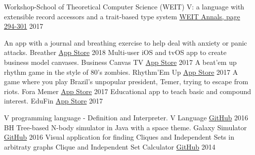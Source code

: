 

\begin{cventries}
  \cventry
    {Workshop-School of Theoretical Computer Science (WEIT)}
    {V: a language with extensible record accessors and a trait-based type system}
    {\href{http://weit2017.inf.ufsm.br/wp-content/uploads/2017/10/Versao_final.pdf}{WEIT Annals, page 294-301}}
    {2017}
    {
    }
\end{cventries}


\begin{cventries}
  \cvcompactentry
    {An app with a journal and breathing exercise to help deal with anxiety or panic attacks.}
    {Breather}
    {\href{https://itunes.apple.com/app/id1370659046?mt=8}{App Store}}
    {2018}
  \cvcompactentry
    {Multi-user iOS and tvOS app to create business model canvases.}
    {Business Canvas TV}
    {\href{https://itunes.apple.com/app/id1292335686?mt=8}{App Store}}
    {2017}
  \cvcompactentry
    {A beat'em up rhythm game in the style of 80's zombies.}
    {Rhythm'Em Up}
    {\href{https://itunes.apple.com/app/id1231577657?mt=8}{App Store}}
    {2017}
  \cvcompactentry
    {A game where you play Brazil's unpopular president, Temer, trying to escape from riots.}
    {Fora Memer}
    {\href{https://itunes.apple.com/br/app/fora-memer/id1253655537?l=en&mt=8}{App Store}}
    {2017}
  \cvcompactentry
    {Educational app to teach basic and compound interest.}
    {EduFin}
    {\href{https://itunes.apple.com/app/id1231577657?mt=8}{App Store}}
    {2017}
\end{cventries}


\begin{cventries}
  \cvcompactentry
    {V programming language - Definition and Interpreter.}
    {V Language}
    {\href{https://github.com/AvatarHurden/V}{GitHub}}
    {2016}
  \cvcompactentry
    {BH Tree-based N-body simulator in Java with a space theme.}
    {Galaxy Simulator}
    {\href{https://github.com/AvatarHurden/Simulador-Galaxias}{GitHub}}
    {2016}
  \cvcompactentry
    {Visual application for finding Cliques and Independent Sets in arbitraty graphs}
    {Clique and Independent Set Calculator}
    {\href{https://github.com/AvatarHurden/Clique-and-Ind.Set-Calculator}{GitHub}}
    {2014}
\end{cventries}

